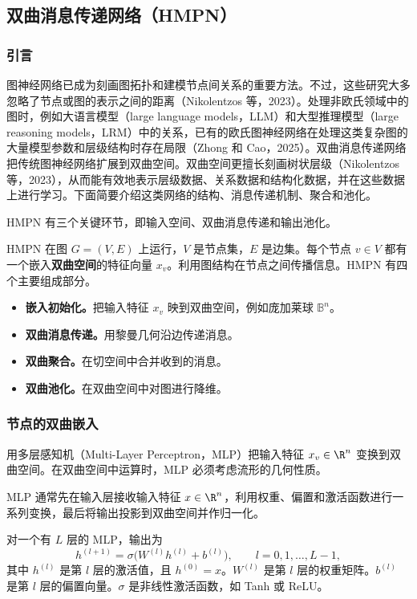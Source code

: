 \subsection{双曲消息传递网络（HMPN）}
\subsubsection{引言}
图神经网络已成为刻画图拓扑和建模节点间关系的重要方法。不过，这些研究大多忽略了节点或图的表示之间的距离（Nikolentzos 等，2023）。处理非欧氏领域中的图时，例如大语言模型（large language models，LLM）和大型推理模型（large reasoning models，LRM）中的关系，已有的欧氏图神经网络在处理这类复杂图的大量模型参数和层级结构时存在局限（Zhong 和 Cao，2025）。双曲消息传递网络把传统图神经网络扩展到双曲空间。双曲空间更擅长刻画树状层级（Nikolentzos 等，2023），从而能有效地表示层级数据、关系数据和结构化数据，并在这些数据上进行学习。下面简要介绍这类网络的结构、消息传递机制、聚合和池化。

HMPN 有三个关键环节，即输入空间、双曲消息传递和输出池化。

HMPN 在图 $G=(V,E)$ 上运行，$V$ 是节点集，$E$ 是边集。每个节点 $v\in V$ 都有一个嵌入\textbf{双曲空间}的特征向量 $x_v$。利用图结构在节点之间传播信息。HMPN 有四个主要组成部分。
\begin{itemize}
  \item \textbf{嵌入初始化。}把输入特征 $x_v$ 映到双曲空间，例如庞加莱球 $\mathbb B^n$。
  \item \textbf{双曲消息传递。}用黎曼几何沿边传递消息。
  \item \textbf{双曲聚合。}在切空间中合并收到的消息。
  \item \textbf{双曲池化。}在双曲空间中对图进行降维。
\end{itemize}

\subsubsection{节点的双曲嵌入}
用多层感知机（Multi-Layer Perceptron，MLP）把输入特征 $x_v\in\R^n$ 变换到双曲空间。在双曲空间中运算时，MLP 必须考虑流形的几何性质。

MLP 通常先在输入层接收输入特征 $x\in\R^n$，利用权重、偏置和激活函数进行一系列变换，最后将输出投影到双曲空间并作归一化。

对一个有 $L$ 层的 MLP，输出为
\[
  h^{(l+1)}=\sigma\bigl(W^{(l)}h^{(l)}+b^{(l)}\bigr),
  \qquad l=0,1,\ldots,L-1,
\]
其中 $h^{(l)}$ 是第 $l$ 层的激活值，且 $h^{(0)}=x$。$W^{(l)}$ 是第 $l$ 层的权重矩阵。$b^{(l)}$ 是第 $l$ 层的偏置向量。$\sigma$ 是非线性激活函数，如 Tanh 或 ReLU。

